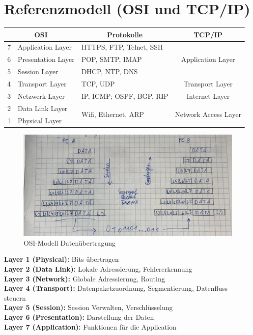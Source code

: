 \section{Referenzmodell (OSI und TCP/IP)}
\begin{center}
	\begin{tabular}{|cl|l|c|}
		\hline
		\multicolumn{2}{|c|}{OSI} & \multicolumn{1}{c|}{Protokolle} & TCP/IP \\ \hline
		\multicolumn{1}{|c|}{7} & Application Layer & HTTPS, FTP, Telnet, SSH & \multirow{3}{*}{Application Layer} \\ \cline{1-3}
		\multicolumn{1}{|c|}{6} & Presentation Layer & POP, SMTP, IMAP &  \\ \cline{1-3}
		\multicolumn{1}{|c|}{5} & Session Layer & DHCP, NTP, DNS &  \\ \hline
		\multicolumn{1}{|c|}{4} & Transport Layer & TCP, UDP & Transport Layer \\ \hline
		\multicolumn{1}{|c|}{3} & Netzwerk Layer & IP, ICMP; OSPF, BGP, RIP & Internet Layer \\ \hline
		\multicolumn{1}{|c|}{2} & Data Link Layer & \multirow{2}{*}{Wifi, Ethernet, ARP} & \multirow{2}{*}{Network Access Layer} \\ \cline{1-2}
		\multicolumn{1}{|c|}{1} & Physical Layer &  &  \\ \hline
	\end{tabular}
\end{center}

\begin{figure}[H]
	\centering
	\includegraphics[width=0.9\linewidth]{figures/datenuber.jpeg}
	\caption{OSI-Modell Datenübertragung}
\end{figure}

\textbf{Layer 1 (Physical):} Bits übertragen \\
\textbf{Layer 2 (Data Link):} Lokale Adressierung, Fehlererkennung \\
\textbf{Layer 3 (Network):} Globale Adressierung, Routing \\
\textbf{Layer 4 (Transport):} Datenpaketzuordnung, Segmentierung, Datenfluss steuern \\
\textbf{Layer 5 (Session):} Session Verwalten, Verschlüsselung \\
\textbf{Layer 6 (Presentation):} Darstellung der Daten \\
\textbf{Layer 7 (Application):} Funktionen für die Application \\

